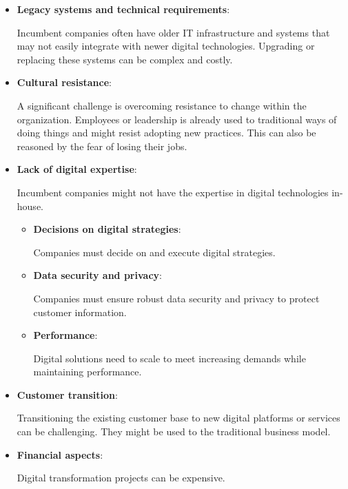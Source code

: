 \documentclass[a4]{scrartcl}
\begin{document}
	
	\begin{itemize}
		
		\item \textbf{Legacy systems and technical requirements}: 
		
		Incumbent companies often have older IT infrastructure and systems that may not easily integrate with newer digital technologies. Upgrading or replacing these systems can be complex and costly.  \cite{legacy, wiwi}
		
		
		\item \textbf{Cultural resistance}: 
		
		A significant challenge is overcoming resistance to change within the organization. Employees or leadership is already used to traditional ways of doing things and might resist adopting new practices. This can also be reasoned by the fear of losing their jobs. \cite{acceptance, wiwi}
		
		
		\item \textbf{Lack of digital expertise}: 
		
		Incumbent companies might not have the expertise in digital technologies in-house. \cite{wiwi}
		
		\begin{itemize}
			
			\item \textbf{Decisions on digital strategies}: 
			
			Companies must decide on and execute digital strategies. \cite{digitalmatrix, leadingdigital, wiwi}
			
			\item \textbf{Data security and privacy}: 
			
			Companies must ensure robust data security and privacy to protect customer information. \cite{digitalmatrix, wiwi}
			
			\item \textbf{Performance}: 
			
			Digital solutions need to scale to meet increasing demands while maintaining performance. \cite{leadingdigital, wiwi}
			
		\end{itemize}
		
		
		\item \textbf{Customer transition}: 
		
		Transitioning the existing customer base to new digital platforms or services can be challenging. They might be used to the traditional business model. \cite{wiwi}
		
		
		\item \textbf{Financial aspects}: 
		
		Digital transformation projects can be expensive. \cite{digitalmatrix, leadingdigital, wiwi}
		

	\end{itemize}
\end{document}
